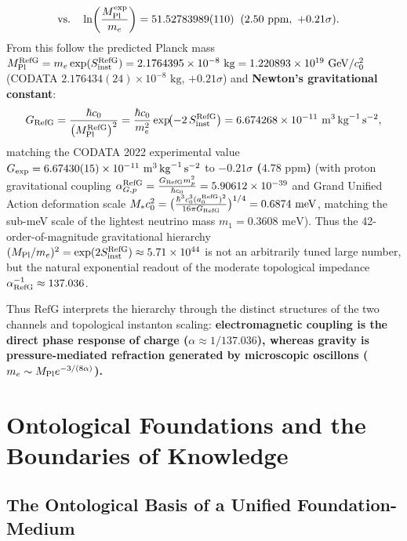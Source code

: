 \documentclass[11pt,a4paper]{article}
\newcommand{\RefG}{\mathrm{RefG}}
\begin{document}
\begin{enumerate}[label=\arabic*.]
\begin{equation}
\begin{aligned}
&\text{vs.}\quad \ln\!\left(\frac{M_{\rm Pl}^{\rm exp}}{m_e}\right) = 51.52783989(110) \;\;(2.50\text{ ppm},\ +0.21\sigma).
\end{aligned}
\end{equation}
From this follow the predicted Planck mass \textbf{$M_{\rm Pl}^{\rm RefG} = m_e\exp(S_{\rm inst}^{\rm RefG}) = 2.1764395\times 10^{-8}\text{ kg} = 1.220893\times 10^{19}\text{ GeV}/c_0^2$} (CODATA $2.176434(24)\times 10^{-8}\text{ kg}$, $+0.21\sigma$) and \textbf{Newton's gravitational constant}:
\begin{equation}
G_{\rm RefG} = \frac{\hbar c_0}{\bigl(M_{\rm Pl}^{\rm RefG}\bigr)^2} = \frac{\hbar c_0}{m_e^2}\exp\!\bigl(-2\,S_{\rm inst}^{\rm RefG}\bigr) = 6.674268\times 10^{-11}\text{ m}^3\,\text{kg}^{-1}\,\text{s}^{-2},
\end{equation}
matching the CODATA 2022 experimental value $G_{\rm exp} = 6.67430(15)\times 10^{-11}\text{ m}^3\,\text{kg}^{-1}\,\text{s}^{-2}$ to \textbf{$-0.21\sigma$ ($4.78\text{ ppm}$)} (with proton gravitational coupling $\alpha_{G,p}^{\rm RefG} = \frac{G_{\rm RefG}m_p^2}{\hbar c_0} = 5.90612\times 10^{-39}$ and Grand Unified Action deformation scale $M_* c_0^2 = \bigl(\frac{\hbar^3 c_0^3 (a_0^{\rm RefG})^2}{16\pi G_{\rm RefG}}\bigr)^{1/4} = 0.6874\text{ meV}$, matching the sub-meV scale of the lightest neutrino mass $m_1 = 0.3608\text{ meV}$). Thus the 42-order-of-magnitude gravitational hierarchy $(M_{\rm Pl}/m_e)^2 = \exp(2 S_{\rm inst}^{\rm RefG}) \approx 5.71\times 10^{44}$ is not an arbitrarily tuned large number, but the natural exponential readout of the moderate topological impedance $\alpha_{\rm RefG}^{-1} \approx 137.036$.
\end{enumerate}

Thus $\RefG$ interprets the hierarchy through the distinct structures of the two channels and topological instanton scaling: \textbf{electromagnetic coupling is the direct phase response of charge ($\alpha \approx 1/137.036$), whereas gravity is pressure-mediated refraction generated by microscopic oscillons ($m_e \sim M_{\rm Pl}e^{-3/(8\alpha)}$).}

\section{Ontological Foundations and the Boundaries of Knowledge}

\subsection{The Ontological Basis of a Unified Foundation-Medium}
\end{document}
